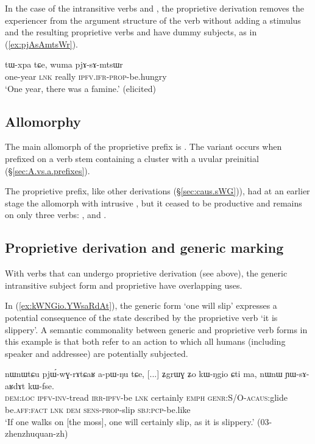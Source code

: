 In the case of the intransitive verbs  and , the proprietive derivation removes the experiencer from the argument structure of the verb without adding a stimulus and the resulting proprietive verbs  and  have dummy subjects, as in (\ref{ex:pjAsAmtsWr}).

\begin{exe}
\ex \label{ex:pjAsAmtsWr}
\gll tɯ-xpa tɕe, wuma pjɤ-sɤ-mtsɯr \\
one-year \textsc{lnk} really \textsc{ipfv}.\textsc{ifr}-\textsc{prop}-be.hungry \\
\glt `One year, there was a famine.' (elicited)
\end{exe}

\subsection{Allomorphy} \label{sec:proprietive.allomorphy}
The main allomorph of the proprietive prefix is . The variant  occurs when prefixed on a verb stem containing a cluster with a uvular preinitial (§\ref{sec:A.vs.a.prefixes}). 

The proprietive prefix, like other derivations (§\ref{sec:caus.sWG})), had at an earlier stage the allomorph  with intrusive , but it ceased to be productive and remains on only three verbs: ,  and .

\subsection{Proprietive derivation and generic marking} \label{sec:proprietive.generic}
With verbs that can undergo proprietive derivation (see above), the generic intransitive subject  form and proprietive have overlapping uses. 

In (\ref{ex:kWNGio.YWsaRdAt}), the generic form  `one will slip' expresses a potential consequence of the state described by the proprietive verb  `it is slippery'. A semantic commonality between generic and proprietive verb forms in this example is that both refer to an action to which all humans (including speaker and addressee) are potentially subjected.

\begin{exe}
\ex \label{ex:kWNGio.YWsaRdAt}
\gll nɯnɯtɕu pjɯ́-wɣ-rɤtɕaʁ a-pɯ-ŋu tɕe, [...] ʑgrɯɣ ʑo kɯ-ŋgio ɕti ma, nɯnɯ ɲɯ-sɤ-aʁdɤt kɯ-fse. \\
\textsc{dem}:\textsc{loc} \textsc{ipfv}-\textsc{inv}-tread \textsc{irr}-\textsc{ipfv}-be \textsc{lnk} { } certainly \textsc{emph} \textsc{genr}:S/O-\textsc{acaus}:glide be.\textsc{aff}:\textsc{fact} \textsc{lnk} \textsc{dem} \textsc{sens}-\textsc{prop}-slip \textsc{sbj}:\textsc{pcp}-be.like \\
\glt `If one walks on [the moss], one will certainly slip, as it is slippery.' (03-zhenzhuquan-zh) 
\end{exe}


